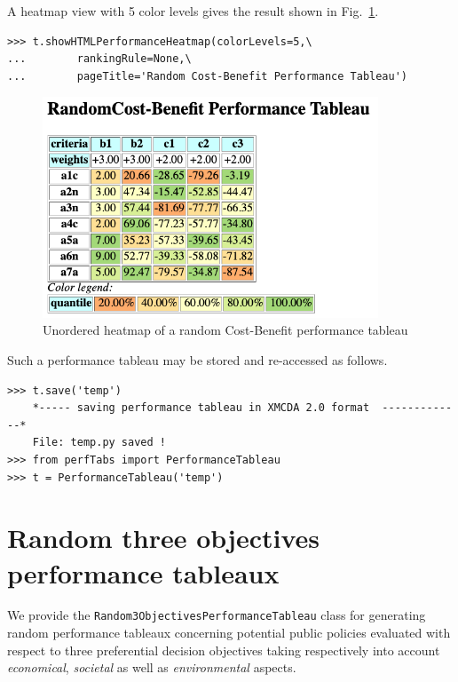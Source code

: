 A heatmap view with 5 color levels gives the result shown in Fig.~\ref{fig:6.2}.
\begin{lstlisting}
>>> t.showHTMLPerformanceHeatmap(colorLevels=5,\
...        rankingRule=None,\
...        pageTitle='Random Cost-Benefit Performance Tableau')
 \end{lstlisting}
\begin{figure}[h]
\includegraphics[width=10cm]{Figures/randomCBHeatmap.png}
\caption{Unordered heatmap of a random Cost-Benefit performance tableau}
\label{fig:6.2}       %
\end{figure}
 
Such a performance tableau may be stored and re-accessed as follows.
\begin{lstlisting}
>>> t.save('temp')
    *----- saving performance tableau in XMCDA 2.0 format  -------------*
    File: temp.py saved !
>>> from perfTabs import PerformanceTableau
>>> t = PerformanceTableau('temp')
\end{lstlisting}

\section{Random three objectives performance tableaux}
\label{sec:6.4}

We provide the \texttt{Random3ObjectivesPerformanceTableau} class for generating random performance tableaux concerning potential public policies evaluated with respect to three preferential decision objectives taking respectively into account \emph{economical}, \emph{societal} as well as \emph{environmental} aspects.

